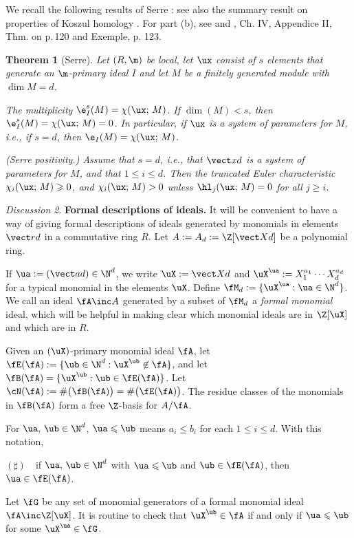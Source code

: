 \documentclass[12pt]{amsart}
\theoremstyle{plain}
\newtheorem{theorem}{Theorem}[section]
\theoremstyle{remark}
\newtheorem{discussion}[theorem]{Discussion}
\theoremstyle{definition}
\numberwithin{equation}{theorem}
\renewcommand{\geq}{\geqslant} \renewcommand{\leq}{\leqslant}
\begin{document}
We recall the following results of Serre \cite{Ser75}:  see also the  summary result on
properties of Koszul homology \cite[Thm.\,3.4(n)]{BHM26}.
For part (b), see \cite[Thm.\,3.4(o)]{BHM26} and 
\cite{Ser75}, Ch.\,\,IV,\,\,Appendice\,\,II, Thm. on p.\,120 and Exemple,\,\,p.\,\,123.
\smallskip

\begin{theorem}[Serre]\label{serre} Let $(R, \m)$ be local, let $\ux$ consist of $s$ elements that
generate an $\m$-primary ideal $I$ 
and let $M$ be a finitely generated module with $\dim M = d$.

\bena
\item The multiplicity $\e^s_I(M) = \chi(\ux;\,M)$. If $\dim(M) < s$, 
then  $\e^s_I(M) = \chi(\ux;\,M) = 0$.
In particular, if $\ux$ is a system of parameters for 
$M$, i.e., if  $s = d$, then
$\e_I(M) = \chi(\ux;\,M)$. %

\item {\rm (Serre positivity.)} Assume that $s =d$, i.e.,  that $\vect xd$ is a 
system of parameters for $M$, and that
$1 \leq i \leq d$.  Then the truncated Euler characteristic 
$\chi_i(\ux;\, M) \geq 0$, and  $\chi_i(\ux;\,M) > 0$ unless 
$\hl_j(\ux;\,M) =0$ for all $j \geq i$. %
\een \end{theorem}

\smallskip

\begin{discussion}\label{formal}{\bf Formal descriptions of ideals.} It will be convenient to have a way of giving  formal descriptions of ideals generated by monomials in elements $\vect rd$ in a commutative ring $R$.  
Let $A:= A_d := \Z[\vect Xd]$ be a polynomial ring. 

If $\ua := (\vect a d) \in \N^d$, we write
$\uX:= \vect Xd$ and $\uX^\ua := X_1^{a_1} \cdots X_d^{a_d}$ 
for a typical monomial in 
the elements $\uX$. Define 
$\fM_d := \{\uX^\ua : \ua \in \N^d\}$.  We call an ideal
 $\fA \inc A$ generated by a subset
of $\fM_d$ a {\it formal monomial} ideal, which will be helpful in making clear which 
monomial ideals are in $\Z[\uX]$ and which are in $R$.

Given an $(\uX)$-primary monomial ideal $\fA$, let 
$\fE(\fA) := \{\ub \in \N^d: \uX^\ub \not \in \fA\}$, and let 
$\fB(\fA) = \{\uX^{\ub}:\ub \in \fE(\fA)\}$.  Let 
$\cN(\fA) := \#\big(\fB(\fA)\big) = \#\big(\fE(\fA)\big)$.
The residue classes of  the monomials in $\fB(\fA)$ 
form a  free $\Z$-basis for $A/\fA$.

For $\ua, \, \ub \in \N^d$,  $\ua \leq \ub$ 
means $a_i \leq b_i$ for each $1 \leq i \leq d$.
With this notation, \smallskip

\hspace*{30pt}$(\sharp)$\ \ if $\ua, \, \ub \in \N^d$ with 
$\ua \leq \ub$ and $\ub \in \fE(\fA)$, \smallskip
then $\ua \in \fE(\fA)$. 

Let $\fG$ be any 
set of monomial generators of a formal monomial 
ideal $\fA \inc \Z[\uX]$.  It is routine to check that 
$\uX^{\ub} \in \fA$ if and only if $\ua \leq \ub$ for some  $\uX^{\ua} \in \fG$. 
\end{discussion}
\end{document}
